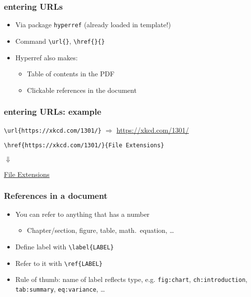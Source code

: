 \documentclass[aspectratio=169]{beamer}
\begin{document}
\begin{frame}[fragile]
  \frametitle{entering URLs }

  \begin{itemize}
    \item Via package \texttt{hyperref} (already loaded in template!)
    \item Command \verb+\url{}+, \verb+\href{}{}+
    \item Hyperref also makes:
          \begin{itemize}
            \item Table of contents in the PDF
            \item Clickable references in the document
          \end{itemize}
  \end{itemize}

\end{frame}

\begin{frame}[fragile]
  \frametitle{entering URLs: example}

  \verb+\url{https://xkcd.com/1301/}+ $\Rightarrow$ \url{https://xkcd.com/1301/}

  \bigskip

  \verb+\href{https://xkcd.com/1301/}{File Extensions}+

  $\Downarrow$

  \href{https://xkcd.com/1301/}{File Extensions}

\end{frame}

\begin{frame}[fragile]
  \frametitle{References in a document}

  \begin{itemize}
    \item You can refer to anything that has a number
    \begin{itemize}
        \item Chapter/section, figure, table, math.~equation, \ldots
    \end{itemize}
    \item Define label with \verb+\label{LABEL}+
    \item Refer to it with \verb+\ref{LABEL}+
    \item Rule of thumb: name of label reflects type, e.g. \texttt{fig:chart}, \texttt{ch:introduction}, \texttt{tab:summary}, \texttt{eq:variance}, \ldots   
  \end{itemize}

\end{frame}
\end{document}
